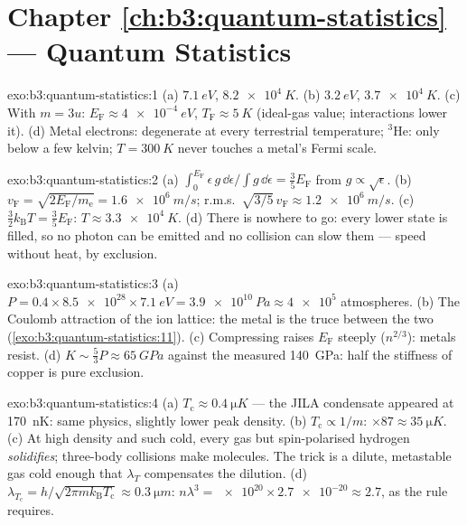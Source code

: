 \section*{Chapter \ref{ch:b3:quantum-statistics} --- Quantum Statistics}

\begin{solution}{exo:b3:quantum-statistics:1}
(a) $\qty{7.1}{eV}$, $\qty{8.2e4}{K}$. (b) $\qty{3.2}{eV}$,
$\qty{3.7e4}{K}$. (c) With $m = 3u$: $E_{\text{F}} \approx
\qty{4e-4}{eV}$, $T_{\text{F}} \approx \qty{5}{K}$ (ideal-gas
value; interactions lower it). (d) Metal electrons: degenerate at
every terrestrial temperature; $^3$He: only below a few kelvin;
$T = \qty{300}{K}$ never touches a metal's Fermi scale.
\end{solution}

\begin{solution}{exo:b3:quantum-statistics:2}
(a) $\int_0^{E_{\text{F}}}\epsilon\,g\,\dd\epsilon/\int g\,\dd
\epsilon = \tfrac35 E_{\text{F}}$ from $g \propto \sqrt\epsilon$.
(b) $v_{\text{F}} = \sqrt{2E_{\text{F}}/m_{\text{e}}} =
\qty{1.6e6}{m/s}$; r.m.s.\ $\sqrt{3/5}\,v_{\text{F}} \approx
\qty{1.2e6}{m/s}$. (c) $\tfrac32 k_{\text{B}}T = \tfrac35
E_{\text{F}}$: $T \approx \qty{3.3e4}{K}$. (d) There is nowhere to
go: every lower state is filled, so no photon can be emitted and no
collision can slow them --- speed without heat, by exclusion.
\end{solution}

\begin{solution}{exo:b3:quantum-statistics:3}
(a) $P = 0.4 \times \num{8.5e28} \times \qty{7.1}{eV} =
\qty{3.9e10}{Pa} \approx \num{4e5}$ atmospheres. (b) The Coulomb
attraction of the ion lattice: the metal is the truce between the
two (\cref{exo:b3:quantum-statistics:11}). (c) Compressing raises
$E_{\text{F}}$ steeply ($n^{2/3}$): metals resist. (d) $K \sim
\tfrac53 P \approx \qty{65}{GPa}$ against the measured
\qty{140}{GPa}: half the stiffness of copper is pure exclusion.
\end{solution}

\begin{solution}{exo:b3:quantum-statistics:4}
(a) $T_{\text{c}} \approx \qty{0.4}{\micro K}$ --- the JILA
condensate appeared at \qty{170}{nK}: same physics, slightly lower
peak density. (b) $T_{\text{c}} \propto 1/m$: $\times87 \approx
\qty{35}{\micro K}$. (c) At high density and such cold, every gas
but spin-polarised hydrogen \emph{solidifies}; three-body
collisions make molecules. The trick is a dilute, metastable gas
cold enough that $\lambda_T$ compensates the dilution. (d)
$\lambda_{T_{\text{c}}} = h/\sqrt{2\pi mk_{\text{B}}T_{\text{c}}}
\approx \qty{0.3}{\micro m}$: $n\lambda^3 = \num{e20} \times
\num{2.7e-20} \approx 2.7$, as the rule requires.
\end{solution}


